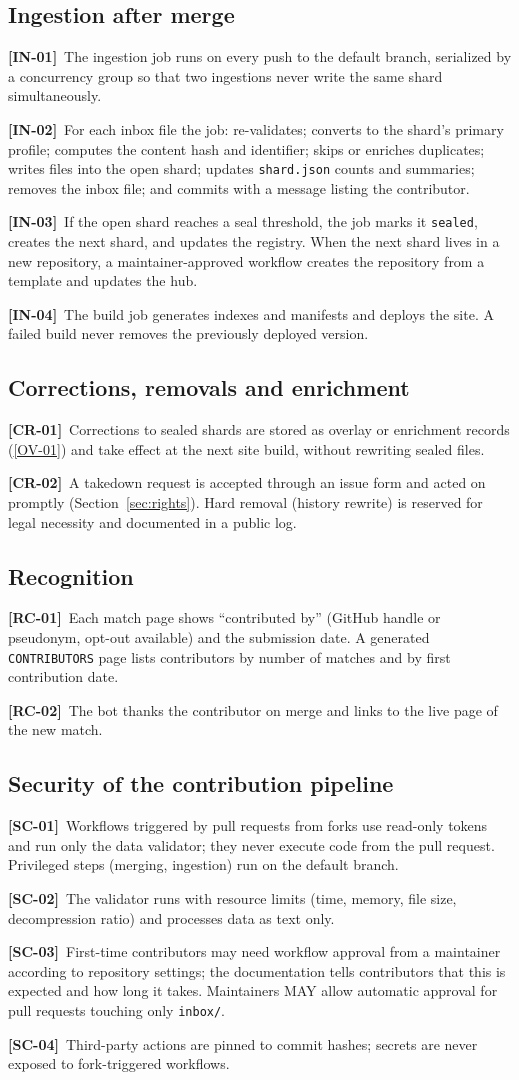 \documentclass[11pt,a4paper]{article}
\newcommand{\req}[2]{\par\smallskip\noindent\hypertarget{#1}{}\textbf{[#1]}\ #2\par}
\newcommand{\rref}[1]{\hyperlink{#1}{[#1]}}
\begin{document}
\subsection{Ingestion after merge}\label{sec:ingest}
\req{IN-01}{The ingestion job runs on every push to the default branch, serialized by a concurrency group so that two ingestions never write the same shard simultaneously.}
\req{IN-02}{For each inbox file the job: re-validates; converts to the shard's primary profile; computes the content hash and identifier; skips or enriches duplicates; writes files into the open shard; updates \texttt{shard.json} counts and summaries; removes the inbox file; and commits with a message listing the contributor.}
\req{IN-03}{If the open shard reaches a seal threshold, the job marks it \texttt{sealed}, creates the next shard, and updates the registry. When the next shard lives in a new repository, a maintainer-approved workflow creates the repository from a template and updates the hub.}
\req{IN-04}{The build job generates indexes and manifests and deploys the site. A failed build never removes the previously deployed version.}

\subsection{Corrections, removals and enrichment}
\req{CR-01}{Corrections to sealed shards are stored as overlay or enrichment records (\rref{OV-01}) and take effect at the next site build, without rewriting sealed files.}
\req{CR-02}{A takedown request is accepted through an issue form and acted on promptly (Section~\ref{sec:rights}). Hard removal (history rewrite) is reserved for legal necessity and documented in a public log.}

\subsection{Recognition}
\req{RC-01}{Each match page shows ``contributed by'' (GitHub handle or pseudonym, opt-out available) and the submission date. A generated \texttt{CONTRIBUTORS} page lists contributors by number of matches and by first contribution date.}
\req{RC-02}{The bot thanks the contributor on merge and links to the live page of the new match.}

\subsection{Security of the contribution pipeline}
\req{SC-01}{Workflows triggered by pull requests from forks use read-only tokens and run only the data validator; they never execute code from the pull request. Privileged steps (merging, ingestion) run on the default branch.}
\req{SC-02}{The validator runs with resource limits (time, memory, file size, decompression ratio) and processes data as text only.}
\req{SC-03}{First-time contributors may need workflow approval from a maintainer according to repository settings; the documentation tells contributors that this is expected and how long it takes. Maintainers MAY allow automatic approval for pull requests touching only \texttt{inbox/}.}
\req{SC-04}{Third-party actions are pinned to commit hashes; secrets are never exposed to fork-triggered workflows.}
\end{document}
